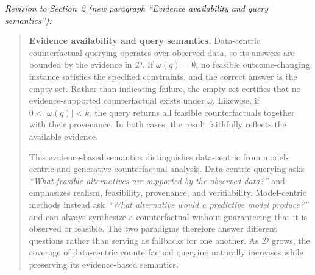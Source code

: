 \noindent\emph{Revision to Section~2 (new paragraph ``Evidence availability and query semantics''):}
\begin{quote}
{\color{blue}\textbf{Evidence availability and query semantics.}
Data-centric counterfactual querying operates over observed data, so its answers are bounded by the evidence in $\mathcal D$. If $\omega(q)=\emptyset$, no feasible outcome-changing instance satisfies the specified constraints, and the correct answer is the empty set. Rather than indicating failure, the empty set certifies that no evidence-supported counterfactual exists under $\omega$. Likewise, if $0<|\omega(q)|<k$, the query returns all feasible counterfactuals together with their provenance. In both cases, the result faithfully reflects the available evidence.

This evidence-based semantics distinguishes data-centric from model-centric and generative counterfactual analysis. Data-centric querying asks \emph{``What feasible alternatives are supported by the observed data?''} and emphasizes realism, feasibility, provenance, and verifiability. Model-centric methods instead ask \emph{``What alternative would a predictive model produce?''} and can always synthesize a counterfactual without guaranteeing that it is observed or feasible. The two paradigms therefore answer different questions rather than serving as fallbacks for one another. As $\mathcal D$ grows, the coverage of data-centric counterfactual querying naturally increases while preserving its evidence-based semantics.}
\end{quote}
